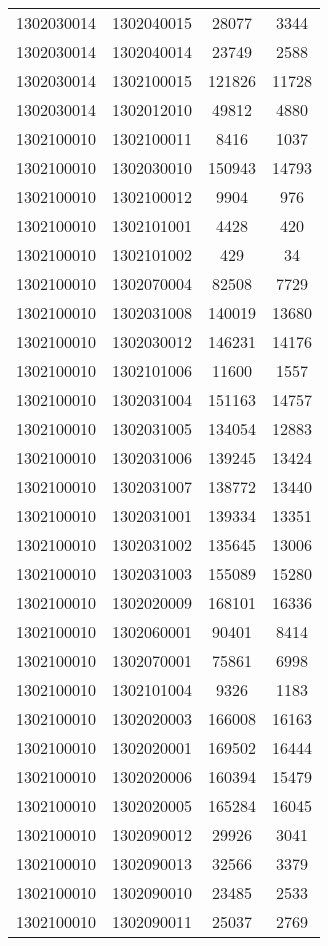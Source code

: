 \begin{longtable}{llcc}
1302030014 & 1302040015 & 28077 & 3344\\
1302030014 & 1302040014 & 23749 & 2588\\
1302030014 & 1302100015 & 121826 & 11728\\
1302030014 & 1302012010 & 49812 & 4880\\
1302100010 & 1302100011 & 8416 & 1037\\
1302100010 & 1302030010 & 150943 & 14793\\
1302100010 & 1302100012 & 9904 & 976\\
1302100010 & 1302101001 & 4428 & 420\\
1302100010 & 1302101002 & 429 & 34\\
1302100010 & 1302070004 & 82508 & 7729\\
1302100010 & 1302031008 & 140019 & 13680\\
1302100010 & 1302030012 & 146231 & 14176\\
1302100010 & 1302101006 & 11600 & 1557\\
1302100010 & 1302031004 & 151163 & 14757\\
1302100010 & 1302031005 & 134054 & 12883\\
1302100010 & 1302031006 & 139245 & 13424\\
1302100010 & 1302031007 & 138772 & 13440\\
1302100010 & 1302031001 & 139334 & 13351\\
1302100010 & 1302031002 & 135645 & 13006\\
1302100010 & 1302031003 & 155089 & 15280\\
1302100010 & 1302020009 & 168101 & 16336\\
1302100010 & 1302060001 & 90401 & 8414\\
1302100010 & 1302070001 & 75861 & 6998\\
1302100010 & 1302101004 & 9326 & 1183\\
1302100010 & 1302020003 & 166008 & 16163\\
1302100010 & 1302020001 & 169502 & 16444\\
1302100010 & 1302020006 & 160394 & 15479\\
1302100010 & 1302020005 & 165284 & 16045\\
1302100010 & 1302090012 & 29926 & 3041\\
1302100010 & 1302090013 & 32566 & 3379\\
1302100010 & 1302090010 & 23485 & 2533\\
1302100010 & 1302090011 & 25037 & 2769\\

\end{longtable}
